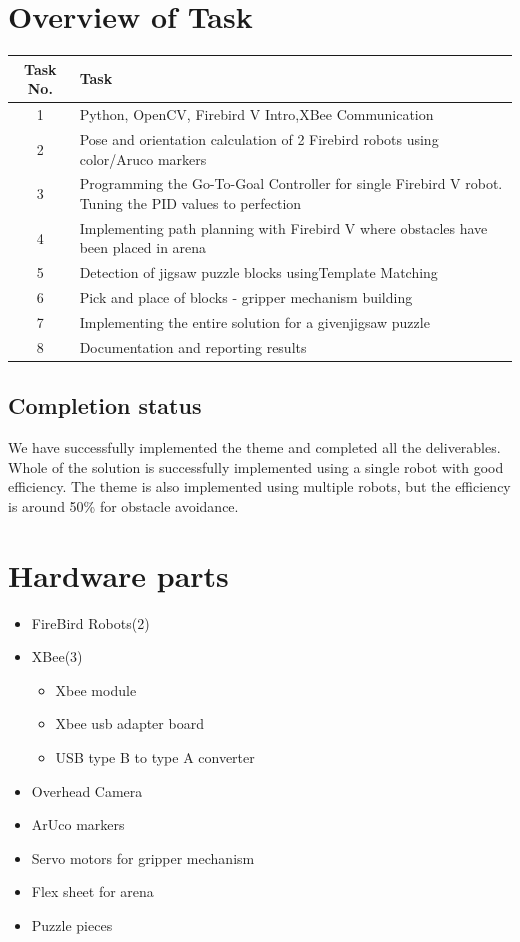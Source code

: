 \documentclass[a4paper,12pt,oneside]{book}
\begin{document}
\section*{Overview of Task}
\begin{tabular}{| c | p{27 em} | }\hline
		\textbf{Task No.} & \hspace{10 em}\textbf{Task}\\\hline
		1 &\small{ Python, OpenCV, Firebird V Intro,XBee Communication} \\\hline
		2 &\small{ Pose and orientation calculation of 2 Firebird robots using\hspace{3 em} color/Aruco markers }\\\hline
		3 &\small{ Programming the Go-To-Goal Controller for single Firebird V robot. Tuning the PID\hspace{0 em} values to perfection }\\\hline
		4 &\small{ Implementing path planning with Firebird V where obstacles have been placed in arena }\\\hline
		5 &\small{ Detection of jigsaw puzzle blocks using\hspace{0 em}Template Matching}\\\hline
		6 &\small{ Pick and place of blocks - gripper mechanism building }\\\hline
		7 &\small{ Implementing the entire solution for a given\hspace{0 em}jigsaw puzzle }\\\hline
		8 &\small{ Documentation and reporting results }\\\hline
	\end{tabular}

\subsection*{Completion status}
We have successfully implemented the theme and completed all the deliverables. Whole of the solution is successfully implemented using a single robot with good efficiency. The theme is also implemented using multiple robots, but the efficiency is around 50\% for obstacle avoidance.  

\section{Hardware parts}
\begin{itemize}
  \item FireBird Robots(2)
  \item  XBee(3)
  \begin{itemize}
  \item Xbee module
  \item Xbee usb adapter board
  \item USB type B to type A converter
  \end{itemize}
   \item Overhead Camera
   \item ArUco markers
   \item Servo motors for gripper mechanism
   \item Flex sheet for arena
   \item Puzzle pieces
\end{itemize}
\end{document}
